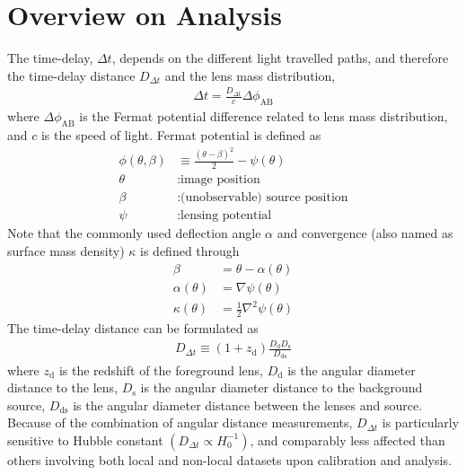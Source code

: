 \documentclass{cosmo}
\begin{document}
\section{Overview on Analysis}
    The time-delay, $\Delta t$, depends on the different light travelled paths, and therefore the time-delay distance $D_{\Delta t}$ and the lens mass distribution, 
    \begin{align*}
        \Delta t = \frac{D_{\Delta t}}{c} \Delta \phi_{\mathrm{AB}}
    \end{align*}
    where $\Delta \phi_{\mathrm{AB}}$ is the Fermat potential difference related to lens mass distribution, and $c$ is the speed of light. Fermat potential is defined as 
    \begin{align*}
        \phi (\theta, \beta) &\equiv \frac{\left(\theta - \beta\right)^2}{2}-\psi(\theta)\\
        \theta &: \text{image position}\\
        \beta &: \text{(unobservable) source position}\\
        \psi &: \text{lensing potential}
    \end{align*}
    Note that the commonly used deflection angle $\alpha$ and convergence (also named as surface mass density) $\kappa$ is defined through
    \begin{align*}
        \beta &= \theta - \alpha(\theta)\\
        \alpha (\theta) &= \nabla \psi (\theta)\\
        \kappa (\theta) &= \frac{1}{2} \nabla^2 \psi(\theta)
    \end{align*}
    The time-delay distance can be formulated as 
    \begin{align*}
        D_{\Delta t} \equiv (1+z_{\mathrm{d}})\frac{D_\mathrm{d} D_\mathrm{s}}{D_\mathrm{ds}}
    \end{align*}
    where $z_\mathrm{d}$ is the redshift of the foreground lens, $D_\mathrm{d}$ is the angular diameter distance to the lens, $D_\mathrm{s}$ is the angular diameter distance to the background source, $D_\mathrm{ds}$ is the angular diameter distance between the lenses and source. Because of the combination of angular distance measurements, $D_{\Delta t}$ is particularly sensitive to Hubble constant $(D_{\Delta t} \propto H_\mathrm{0}^{-1})$, and comparably less affected than others involving both local and non-local datasets upon calibration and analysis. 
    
\end{document}
